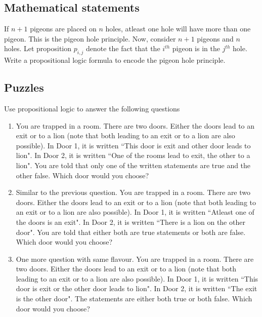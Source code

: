 \subsection{Mathematical statements}
\begin{exercise}
If $n+1$ pigeons are placed on $n$ holes, atleast one hole will have more than one pigeon. This is the pigeon hole principle. Now, consider $n+1$ pigeons and $n$ holes. Let proposition $p_{i,j}$ denote the fact that the $i^{th}$ pigeon is in the $j^{th}$ hole.  Write a propositional logic formula to encode the pigeon hole principle. 
\end{exercise}


\subsection{Puzzles}
\begin{exercise}[Smullyan]
Use propositional logic to answer the following questions
\begin{enumerate}
\item You are trapped in a room. There are two doors. Either the doors lead to an exit or to a lion (note that both leading to an exit or to a lion are also possible). In Door 1, it is written ``This door is exit and other door leads to lion". In Door 2, it is written ``One of the rooms lead to exit, the other to a lion". You are told that only one of the written statements are true and the other false. Which door would you choose?
\item Similar to the previous question. You are trapped in a room. There are two doors. Either the doors lead to an exit or to a lion (note that both leading to an exit or to a lion are also possible). In Door 1, it is written ``Atleast one of the doors is an exit". In Door 2, it is written ``There is a lion on the other door". You are told that either both are true statements or both are false. Which door would you choose?
\item One more question with same flavour. You are trapped in a room. There are two doors. Either the doors lead to an exit or to a lion (note that both leading to an exit or to a lion are also possible). In Door 1, it is written ``This door is exit or the other door leads to lion". In Door 2, it is written ``The exit is the other door". The statements are either both true or both false. Which door would you choose?
\end{enumerate}
\end{exercise}

